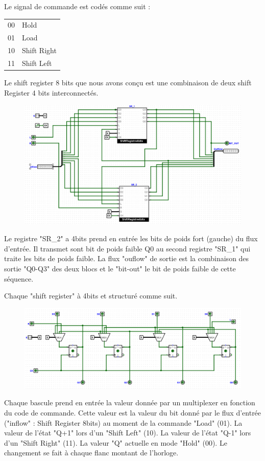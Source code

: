 \documentclass[a4paper]{article} %
\begin{document}
\begin{tcolorbox}[colframe=Monokaimagenta,colback=white, breakable, enhanced]
Le signal de commande est codés comme suit :
\begin{center}
	\begin{tabular}{c|l}
		00	&	Hold\\
		01	&	Load\\
		10	&	Shift Right\\
		11	&	Shift Left\\
	\end{tabular}
\end{center}

Le shift register 8 bits que nous avons conçu est une combinaison de deux shift Register 4 bits interconnectés. 
\begin{figure}[H]
	\centering
	\includegraphics[width=\textwidth]{src/SR_8b}
	\label{fig:SR_8b}
\end{figure}
Le registre "SR\_2" a 4bits prend en entrée les bits de poids fort (gauche) du flux d'entrée. Il transmet sont bit de poids faible Q0 au second registre "SR\_1" qui traite les bits de poids faible. La flux "ouflow" de sortie est la combinaison des sortie "Q0-Q3" des deux blocs et le "bit-out" le bit de poids faible de cette séquence.

Chaque "shift register" à 4bits et structuré comme suit.
\begin{figure}[H]
	\centering
	\includegraphics[width=\textwidth]{src/SR_4b}
	\label{fig:SR_4b}
\end{figure}
Chaque bascule prend en entrée la valeur donnée par un multiplexer en fonction du code de commande. Cette valeur est la valeur du bit donné par le flux d'entrée ("inflow" : Shift Register 8bits) au moment de la commande "Load" (01). La valeur de l'état "Q+1" lors d'un "Shift Left" (10). La valeur de l'état "Q-1" lors d'un "Shift Right" (11). La valeur "Q" actuelle en mode "Hold" (00). Le changement se fait à chaque flanc montant de l'horloge.
\end{tcolorbox}
\end{document}
